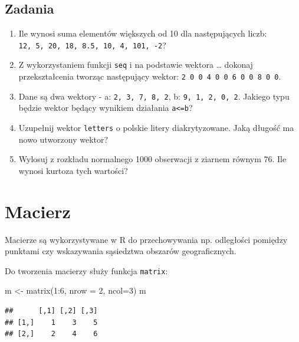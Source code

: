 \documentclass[
]{book}
\newenvironment{Shaded}{\begin{snugshade}}{\end{snugshade}}
\newcommand{\AttributeTok}[1]{\textcolor[rgb]{0.77,0.63,0.00}{#1}}
\newcommand{\DecValTok}[1]{\textcolor[rgb]{0.00,0.00,0.81}{#1}}
\newcommand{\FunctionTok}[1]{\textcolor[rgb]{0.00,0.00,0.00}{#1}}
\newcommand{\NormalTok}[1]{#1}
\newcommand{\OtherTok}[1]{\textcolor[rgb]{0.56,0.35,0.01}{#1}}
\newcommand{\SpecialCharTok}[1]{\textcolor[rgb]{0.00,0.00,0.00}{#1}}
\providecommand{\tightlist}{%
  \setlength{\itemsep}{0pt}\setlength{\parskip}{0pt}}
\begin{document}
\hypertarget{zadania}{%
\subsection{Zadania}\label{zadania}}

\begin{enumerate}
\def\labelenumi{\arabic{enumi}.}
\tightlist
\item
  Ile wynosi suma elementów większych od 10 dla następujących liczb: \texttt{12,\ 5,\ 20,\ 18,\ 8.5,\ 10,\ 4,\ 101,\ -2}?
\item
  Z wykorzystaniem funkcji \texttt{seq} i na podstawie wektora \ldots{} dokonaj przekształcenia tworząc następujący wektor: \texttt{2\ 0\ 0\ 4\ 0\ 0\ 6\ 0\ 0\ 8\ 0\ 0}.
\item
  Dane są dwa wektory - a: \texttt{2,\ 3,\ 7,\ 8,\ 2}, b: \texttt{9,\ 1,\ 2,\ 0,\ 2}. Jakiego typu będzie wektor będący wynikiem działania \texttt{a\textless{}=b}?
\item
  Uzupełnij wektor \texttt{letters} o polskie litery diakrytyzowane. Jaką długość ma nowo utworzony wektor?
\item
  Wylosuj z rozkładu normalnego 1000 obserwacji z ziarnem równym 76. Ile wynosi kurtoza tych wartości?
\end{enumerate}

\hypertarget{macierz}{%
\section{Macierz}\label{macierz}}

Macierze są wykorzystywane w R do przechowywania np. odległości pomiędzy punktami czy wskazywania sąsiedztwa obszarów geograficznych.

Do tworzenia macierzy służy funkcja \texttt{matrix}:

\begin{Shaded}
\begin{Highlighting}[]
\NormalTok{m }\OtherTok{\textless{}{-}} \FunctionTok{matrix}\NormalTok{(}\DecValTok{1}\SpecialCharTok{:}\DecValTok{6}\NormalTok{, }\AttributeTok{nrow =} \DecValTok{2}\NormalTok{, }\AttributeTok{ncol=}\DecValTok{3}\NormalTok{)}
\NormalTok{m}
\end{Highlighting}
\end{Shaded}

\begin{verbatim}
##      [,1] [,2] [,3]
## [1,]    1    3    5
## [2,]    2    4    6
\end{verbatim}
\end{document}
